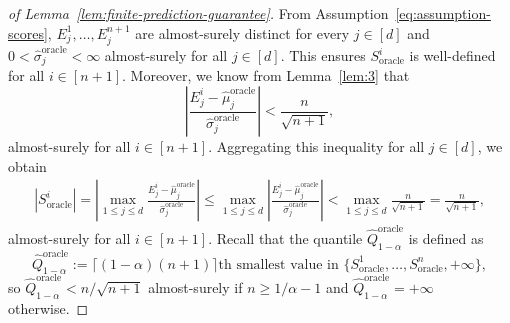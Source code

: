 \begin{proof}[of Lemma~\ref{lem:finite-prediction-guarantee}]
From Assumption~\ref{eq:assumption-scores}, $E^1_j,\dots, E^{n+1}_j$ are almost-surely distinct for every $j \in [d]$ and $0<\hat{\sigma}^{\mathrm{oracle}}_j < \infty$ almost-surely for all $j \in [d]$. This ensures $S_{\mathrm{oracle}}^i$ is well-defined for all $i \in [n+1]$. Moreover, we know from Lemma~\ref{lem:3} that
\[
\left|\frac{E^i_j - \hat{\mu}^{\mathrm{oracle}}_j}{\hat{\sigma}^{\mathrm{oracle}}_j}\right| < \frac{n}{\sqrt{n+1}},
\]
almost-surely for all $i \in [n+1]$. Aggregating this inequality for all $j \in [d]$, we obtain
\begin{align*}
    |S_{\mathrm{oracle}}^i| = \left|\max_{1\leq j\leq d}\frac{E^i_j - \hat{\mu}^{\mathrm{oracle}}_j}{\hat{\sigma}^{\mathrm{oracle}}_j}\right|\leq \max_{1\leq j\leq d}\left|\frac{E^i_j - \hat{\mu}^{\mathrm{oracle}}_j}{\hat{\sigma}^{\mathrm{oracle}}_j}\right|< \max_{1\leq j\leq d}\frac{n}{\sqrt{n+1}}=\frac{n}{\sqrt{n+1}},
\end{align*}
almost-surely for all $i \in [n+1]$. Recall that the quantile $\hat{Q}^{\mathrm{oracle}}_{1-\alpha}$ is defined as
\[
\hat{Q}^{\mathrm{oracle}}_{1-\alpha}:= \lceil(1-\alpha)(n+1)\rceil\text{th smallest value in } \{S_{\mathrm{oracle}}^1,\dots, S_{\mathrm{oracle}}^n, +\infty\},
\]
so $\hat{Q}^{\mathrm{oracle}}_{1-\alpha} < n/\sqrt{n+1}$ almost-surely if $n \geq 1/\alpha-1$ and $\hat{Q}^{\mathrm{oracle}}_{1-\alpha} = +\infty$ otherwise.
\end{proof}


